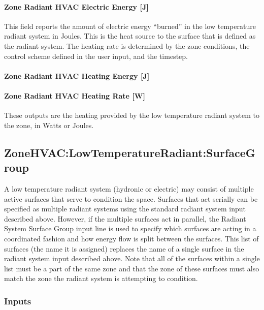 \paragraph{Zone Radiant HVAC Electric Energy {[}J{]}}\label{zone-radiant-hvac-electric-energy-j}

This field reports the amount of electric energy ``burned'' in the low temperature radiant system in Joules. This is the heat source to the surface that is defined as the radiant system. The heating rate is determined by the zone conditions, the control scheme defined in the user input, and the timestep.

\paragraph{Zone Radiant HVAC Heating Energy {[}J{]}}\label{zone-radiant-hvac-heating-energy-j-2}

\paragraph{Zone Radiant HVAC Heating Rate {[}W{]}}\label{zone-radiant-hvac-heating-rate-w-2}

These outputs are the heating provided by the low temperature radiant system to the zone, in Watts or Joules.

\subsection{ZoneHVAC:LowTemperatureRadiant:SurfaceGroup}\label{zonehvaclowtemperatureradiantsurfacegroup}

A low temperature radiant system (hydronic or electric) may consist of multiple active surfaces that serve to condition the space. Surfaces that act serially can be specified as multiple radiant systems using the standard radiant system input described above. However, if the multiple surfaces act in parallel, the Radiant System Surface Group input line is used to specify which surfaces are acting in a coordinated fashion and how energy flow is split between the surfaces. This list of surfaces (the name it is assigned) replaces the name of a single surface in the radiant system input described above. Note that all of the surfaces within a single list must be a part of the same zone and that the zone of these surfaces must also match the zone the radiant system is attempting to condition.

\subsubsection{Inputs}\label{inputs-8-017}

